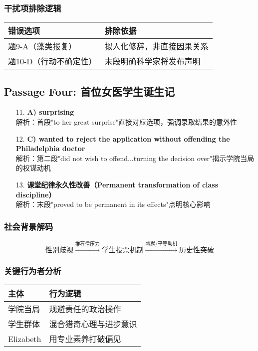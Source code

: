 \documentclass{article}
\begin{document}
\subsubsection*{干扰项排除逻辑}
\begin{tabular}{|l|l|}
\hline
\textbf{错误选项} & \textbf{排除依据} \\
\hline
题9-A（藻类报复） & 拟人化修辞，非直接因果关系 \\
题10-D（行动不确定性） & 末段明确科学家将发布声明 \\
\hline
\end{tabular}

\subsection*{Passage Four: 首位女医学生诞生记}
\begin{enumerate}
    \item[11.] \textbf{A) surprising} \\ 
    解析：首段"to her great surprise"直接对应选项，强调录取结果的意外性
    
    \item[12.] \textbf{C) wanted to reject the application without offending the Philadelphia doctor} \\ 
    解析：第二段"did not wish to offend...turning the decision over"揭示学院当局的权谋动机
    
    \item[13.] \textbf{课堂纪律永久性改善（Permanent transformation of class discipline）} \\ 
    解析：末段"proved to be permanent in its effects"点明核心影响
\end{enumerate}

\subsubsection*{社会背景解码}
\[
\text{性别歧视} \xrightarrow{\text{推荐信压力}} 
\text{学生投票机制} \xrightarrow{\text{幽默/平等动机}} 
\text{历史性突破}
\]

\subsubsection*{关键行为者分析}
\begin{tabular}{|l|l|}
\hline
\textbf{主体} & \textbf{行为逻辑} \\
\hline
学院当局 & 规避责任的政治操作 \\
学生群体 & 混合猎奇心理与进步意识 \\
Elizabeth & 用专业素养打破偏见 \\
\hline
\end{tabular}
\end{document}
